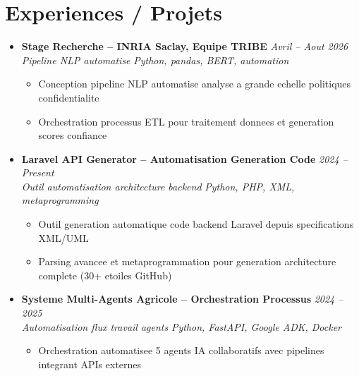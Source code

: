 \documentclass[a4paper,11pt]{article}
\begin{document}
\section{Experiences / Projets}
\begin{itemize}[leftmargin=*, label={-}]

\item \textbf{Stage Recherche -- INRIA Saclay, Equipe TRIBE} \hfill \textit{Avril -- Aout 2026} \\
\textit{Pipeline NLP automatise} \hfill \textit{Python, pandas, BERT, automation}
\vspace{-2pt}
    \begin{itemize}[leftmargin=0.4cm, nosep, label=\tiny$\bullet$]
        \item \small{Conception pipeline NLP automatise analyse a grande echelle politiques confidentialite}
        \item \small{Orchestration processus ETL pour traitement donnees et generation scores confiance}
    \end{itemize}
\vspace{3pt}

\item \textbf{Laravel API Generator -- Automatisation Generation Code} \hfill \textit{2024 -- Present} \\
\textit{Outil automatisation architecture backend} \hfill \textit{Python, PHP, XML, metaprogramming}
\vspace{-2pt}
    \begin{itemize}[leftmargin=0.4cm, nosep, label=\tiny$\bullet$]
        \item \small{Outil generation automatique code backend Laravel depuis specifications XML/UML}
        \item \small{Parsing avancee et metaprogrammation pour generation architecture complete (30+ etoiles GitHub)}
    \end{itemize}
\vspace{3pt}

\item \textbf{Systeme Multi-Agents Agricole -- Orchestration Processus} \hfill \textit{2024 -- 2025} \\
\textit{Automatisation flux travail agents} \hfill \textit{Python, FastAPI, Google ADK, Docker}
\vspace{-2pt}
    \begin{itemize}[leftmargin=0.4cm, nosep, label=\tiny$\bullet$]
        \item \small{Orchestration automatisee 5 agents IA collaboratifs avec pipelines integrant APIs externes}
    \end{itemize}
\vspace{3pt}


\end{itemize}
\end{document}

